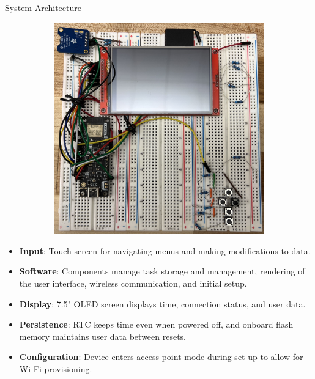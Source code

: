 \documentclass[final, cmyk]{beamer}
\newlength{\colwidth}
\begin{document}
\begin{frame}[t]
\begin{columns}[t]
\begin{column}{\colwidth}
\begin{block}{System Architecture}
\begin{figure}
\begin{subfigure}[t]{0.44\textwidth}
              \includegraphics[width=\textwidth]{prototype.jpg}
          \end{subfigure}
        \end{figure}

        \begin{itemize}
          \item \textbf{Input}: Touch screen for navigating menus and
            making modifications to data.
          \item \textbf{Software}: Components manage task storage and
            management, rendering of the user interface, wireless
            communication, and initial setup.
          \item \textbf{Display}: 7.5" OLED screen displays time, connection status,
            and user data.
          \item \textbf{Persistence}: RTC keeps time even 
            when powered off, and onboard flash memory maintains user data
            between resets.
          \item \textbf{Configuration}: Device enters access point mode during set up to allow for Wi-Fi provisioning.
        \end{itemize}
      \end{block}
    \end{column}


\end{columns}
\end{frame}
\end{document}
